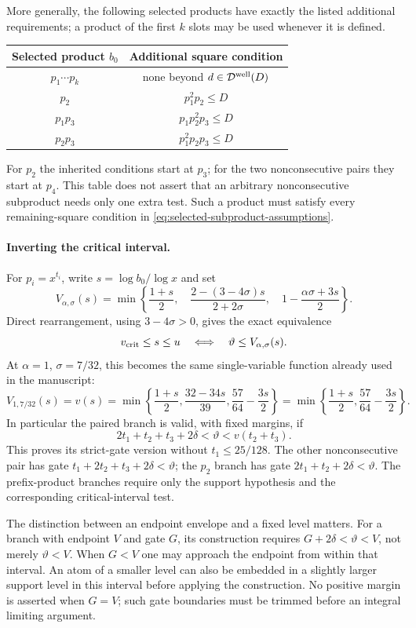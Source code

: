 \documentclass[11pt]{article}
\begin{document}
More generally, the following selected products have exactly the
listed additional requirements; a product of the first $k$ slots may
be used whenever it is defined.
\begin{center}
\begin{tabular}{c|c}
Selected product $b_0$ & Additional square condition \\
\hline
$p_1\cdots p_k$ & none beyond $d\in\mathcal D^{\rm well}(D)$ \\
$p_2$ & $p_1^2p_2\le D$ \\
$p_1p_3$ & $p_1p_2^2p_3\le D$ \\
$p_2p_3$ & $p_1^2p_2p_3\le D$
\end{tabular}
\end{center}
For $p_2$ the inherited conditions start at $p_3$; for the two
nonconsecutive pairs they start at $p_4$.  This table does not assert
that an arbitrary nonconsecutive subproduct needs only one extra test.
Such a product must satisfy every remaining-square condition in
\eqref{eq:selected-subproduct-assumptions}.

\paragraph{Inverting the critical interval.}
For $p_i=x^{t_i}$, write $s=\log b_0/\log x$ and set
\[
 V_{\alpha,\sigma}(s)=\min\left\{
 \frac{1+s}{2},\quad
 \frac{2-(3-4\sigma)s}{2+2\sigma},\quad
 1-\frac{\alpha\sigma+3s}{2}\right\}.
\]
Direct rearrangement, using $3-4\sigma>0$, gives the exact equivalence
\[
 v_{\rm crit}\le s\le u
 \quad\Longleftrightarrow\quad
 \vartheta\le V_{\alpha,\sigma}(s).
\]
At $\alpha=1$, $\sigma=7/32$, this becomes the same single-variable
function already used in the manuscript:
\[
 V_{1,7/32}(s)=v(s)
 =\min\left\{\frac{1+s}{2},\frac{32-34s}{39},
                       \frac{57}{64}-\frac{3s}{2}\right\}
 =\min\left\{\frac{1+s}{2},\frac{57}{64}-\frac{3s}{2}\right\}.
\]
In particular the paired branch is valid, with fixed margins, if
\begin{equation}\label{eq:selected-pair-gate}
 2t_1+t_2+t_3+2\delta<\vartheta<v(t_2+t_3).
\end{equation}
This proves its strict-gate version without $t_1\le25/128$.
The other nonconsecutive pair has gate
$t_1+2t_2+t_3+2\delta<\vartheta$; the $p_2$ branch has gate
$2t_1+t_2+2\delta<\vartheta$.
The prefix-product branches require only the support hypothesis and
the corresponding critical-interval test.

The distinction between an endpoint envelope and a fixed level matters.
For a branch with endpoint $V$ and gate $G$, its construction requires
$G+2\delta<\vartheta<V$, not merely $\vartheta< V$.
When $G<V$ one may approach the endpoint from within that interval.
An atom of a smaller level can also be embedded in a slightly larger
support level in this interval before applying the construction.
No positive margin is asserted when $G=V$; such gate boundaries must
be trimmed before an integral limiting argument.
\end{document}
